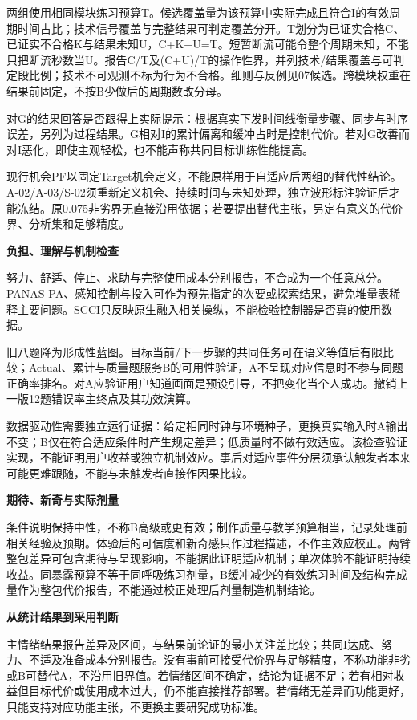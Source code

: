 \documentclass[11pt,a4paper]{article}
\newcommand{\reviewsubsection}[1]{\par\Needspace{4\baselineskip}\vspace{4pt}\begin{center}{\titlelatin\titlecjk\bfseries\fontsize{12}{18}\selectfont #1}\end{center}}
\begin{document}
两组使用相同模块练习预算T。候选覆盖量为该预算中实际完成且符合I的有效周期时间占比；技术信号覆盖与完整结果可判定覆盖分开。T划分为已证实合格C、已证实不合格K与结果未知U，C+K+U=T。短暂断流可能令整个周期未知，不能只把断流秒数当U。报告C/\allowbreak{}T及(C+U)/\allowbreak{}T的操作性界，并列技术/\allowbreak{}结果覆盖与可判定段比例；技术不可观测不标为行为不合格。细则与反例见07候选。跨模块权重在结果前固定，不按B少做后的周期数改分母。


对G的结果回答是否跟得上实际提示：根据真实下发时间线衡量步骤、同步与时序误差，另列为过程结果。G相对I的累计偏离和缓冲占时是控制代价。若对G改善而对I恶化，即使主观轻松，也不能声称共同目标训练性能提高。


现行机会PF以固定Target机会定义，不能原样用于自适应后两组的替代性结论。A-\allowbreak{}02/\allowbreak{}A-\allowbreak{}03/\allowbreak{}S-\allowbreak{}02须重新定义机会、持续时间与未知处理，独立波形标注验证后才能冻结。原0.075非劣界无直接沿用依据；若要提出替代主张，另定有意义的代价界、分析集和足够精度。


\reviewsubsection{5.4 负担、理解与机制检查}
努力、舒适、停止、求助与完整使用成本分别报告，不合成为一个任意总分。PANAS-\allowbreak{}PA、感知控制与投入可作为预先指定的次要或探索结果，避免堆量表稀释主要问题。SCCI只反映原生融入相关操纵，不能检验控制器是否真的使用数据。


旧八题降为形成性蓝图。目标当前/\allowbreak{}下一步骤的共同任务可在语义等值后有限比较；Actual、累计与质量题服务B的可用性验证，A不呈现对应信息时不参与同题正确率排名。对A应验证用户知道画面是预设引导，不把变化当个人成功。撤销上一版12题错误率主终点及其功效演算。


数据驱动性需要独立运行证据：给定相同时钟与环境种子，更换真实输入时A输出不变；B仅在符合适应条件时产生规定差异；低质量时不做有效适应。该检查验证实现，不能证明用户收益或独立机制效应。事后对适应事件分层须承认触发者本来可能更难跟随，不能与未触发者直接作因果比较。


\reviewsubsection{5.5 期待、新奇与实际剂量}
条件说明保持中性，不称B高级或更有效；制作质量与教学预算相当，记录处理前相关经验及预期。体验后的可信度和新奇感只作过程描述，不作主效应校正。两臂整包差异可包含期待与呈现影响，不能据此证明适应机制；单次体验不能证明持续收益。同暴露预算不等于同呼吸练习剂量，B缓冲减少的有效练习时间及结构完成量作为整包代价报告，不能通过校正处理后剂量制造机制结论。

\reviewsubsection{5.6 从统计结果到采用判断}
主情绪结果报告差异及区间，与结果前论证的最小关注差比较；共同I达成、努力、不适及准备成本分别报告。没有事前可接受代价界与足够精度，不称功能非劣或B可替代A，不沿用旧界值。若情绪区间不确定，结论为证据不足；若有相对收益但目标代价或使用成本过大，仍不能直接推荐部署。若情绪无差异而功能更好，只能支持对应功能主张，不更换主要研究成功标准。
\end{document}

